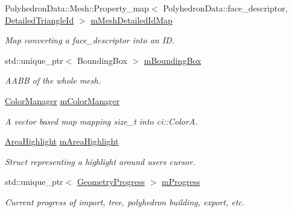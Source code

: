 \begin{DoxyCompactItemize}
Polyhedron\+Data\+::\+Mesh\+::\+Property\+\_\+map$<$ Polyhedron\+Data\+::face\+\_\+descriptor, \mbox{\hyperlink{structpepr3d_1_1_detailed_triangle_id}{Detailed\+Triangle\+Id}} $>$ \mbox{\hyperlink{classpepr3d_1_1_geometry_adf2777044b00de455536e8bc0efc3b07}{m\+Mesh\+Detailed\+Id\+Map}}
\begin{DoxyCompactList}\small\item\em Map converting a face\+\_\+descriptor into an ID. \end{DoxyCompactList}\item 
\mbox{\label{classpepr3d_1_1_geometry_af247be6afb090aa4edecb32786103ae1}} 
std\+::unique\+\_\+ptr$<$ Bounding\+Box $>$ \mbox{\hyperlink{classpepr3d_1_1_geometry_af247be6afb090aa4edecb32786103ae1}{m\+Bounding\+Box}}
\begin{DoxyCompactList}\small\item\em A\+A\+BB of the whole mesh. \end{DoxyCompactList}\item 
\mbox{\label{classpepr3d_1_1_geometry_a435bf3487105e8fb7867614845d69885}} 
\mbox{\hyperlink{classpepr3d_1_1_color_manager}{Color\+Manager}} \mbox{\hyperlink{classpepr3d_1_1_geometry_a435bf3487105e8fb7867614845d69885}{m\+Color\+Manager}}
\begin{DoxyCompactList}\small\item\em A vector based map mapping size\+\_\+t into ci\+::\+ColorA. \end{DoxyCompactList}\item 
\mbox{\label{classpepr3d_1_1_geometry_a47baed18f665dbbe1c69b9b400ace85c}} 
\mbox{\hyperlink{structpepr3d_1_1_geometry_1_1_area_highlight}{Area\+Highlight}} \mbox{\hyperlink{classpepr3d_1_1_geometry_a47baed18f665dbbe1c69b9b400ace85c}{m\+Area\+Highlight}}
\begin{DoxyCompactList}\small\item\em Struct representing a highlight around user\textquotesingle{}s cursor. \end{DoxyCompactList}\item 
\mbox{\label{classpepr3d_1_1_geometry_a0bf613cec3cd854058e183f199542ada}} 
std\+::unique\+\_\+ptr$<$ \mbox{\hyperlink{structpepr3d_1_1_geometry_progress}{Geometry\+Progress}} $>$ \mbox{\hyperlink{classpepr3d_1_1_geometry_a0bf613cec3cd854058e183f199542ada}{m\+Progress}}
\begin{DoxyCompactList}\small\item\em Current progress of import, tree, polyhedron building, export, etc. \end{DoxyCompactList}\end{DoxyCompactItemize}
